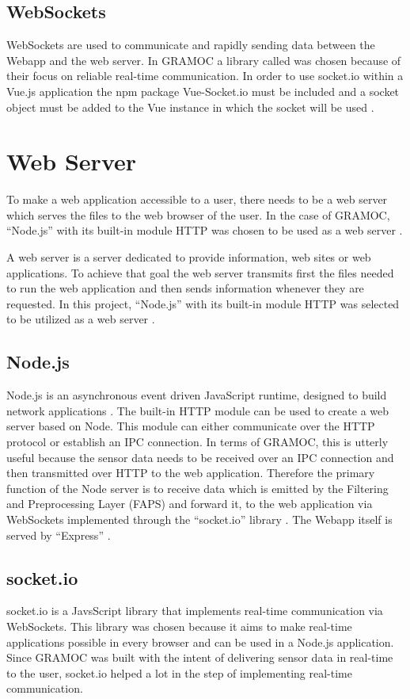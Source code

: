 \subsection{WebSockets}
WebSockets are used to communicate and rapidly sending data between the Webapp and the web server. In GRAMOC a library called  was chosen because of their focus on reliable real-time communication. In order to use socket.io within a Vue.js application the npm package Vue-Socket.io must be included and a socket object must be added to the Vue instance in which the socket will be used \cite{vuesocketio}.

\section{Web Server}
\label{sec:webserver}
To make a web application accessible to a user, there needs to be a web server which serves the files to the web browser of the user. In the case of GRAMOC, ``Node.js'' with its built-in module HTTP was chosen to be used as a web server \cite{Node}.

A web server is a server dedicated to provide information, web sites or web applications. To achieve that goal the web server transmits first the files needed to run the web application and then sends information whenever they are requested. In this project, ``Node.js'' with its built-in module HTTP was selected to be utilized as a web server \cite{Node}.

\subsection{Node.js}
\label{subsec:nodejs}
Node.js is an asynchronous event driven JavaScript runtime, designed to build network applications \cite{Node}. The built-in HTTP module can be used to create a web server based on Node. This module can either communicate over the HTTP protocol or establish an IPC connection. In terms of GRAMOC, this is utterly useful because the sensor data needs to be received over an IPC connection and then transmitted over HTTP to the web application. Therefore the primary function of the Node server is to receive data which is emitted by the Filtering and Preprocessing Layer (FAPS) and forward it, to the web application via WebSockets implemented through the ``socket.io'' library \cite{socketio}. The Webapp itself is served by ``Express'' \cite{express}.

\subsection{socket.io}
\label{subsec:socketio}
socket.io is a JavsScript library that implements real-time communication via WebSockets. This library was chosen because it aims to make real-time applications possible in every browser and can be used in a Node.js application. Since GRAMOC was built with the intent of delivering sensor data in real-time to the user, socket.io helped a lot in the step of implementing real-time communication.

